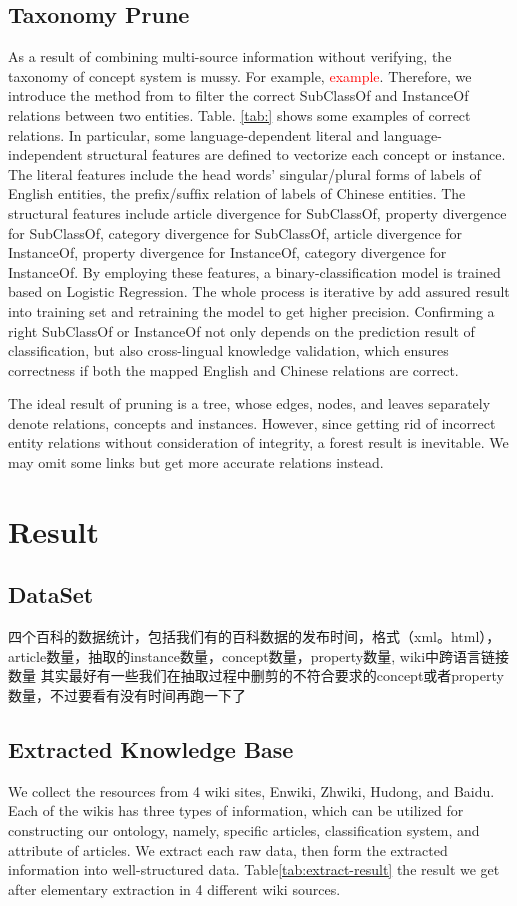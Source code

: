 \documentclass[runningheads,a4paper]{llncs}
\begin{document}
\subsection{Taxonomy Prune}
\label{sec:tp}
As a result of combining multi-source information without verifying, the taxonomy of concept system is mussy. For example, \textcolor{red}{example}. Therefore, we introduce the method from\cite{wang2014cross} to filter the correct SubClassOf and InstanceOf relations between two entities. Table. \ref{tab:} shows some examples of correct relations. In particular, some language-dependent literal and language-independent structural features are defined to vectorize each concept or instance. The literal features include the head words’ singular/plural forms of labels of English entities, the preﬁx/sufﬁx relation of labels of Chinese entities. The structural features include article divergence for SubClassOf, property divergence for SubClassOf, category divergence for SubClassOf, article divergence for InstanceOf, property divergence for InstanceOf, category divergence for InstanceOf. By employing these features, a binary-classification model is trained based on Logistic Regression. The whole process is iterative by add assured result into training set and retraining the model to get higher precision. Confirming a right SubClassOf or InstanceOf not only depends on the prediction result of classification, but also cross-lingual knowledge validation, which ensures correctness if both the mapped English and Chinese relations are correct. 

The ideal result of pruning is a tree, whose edges, nodes, and leaves separately denote relations, concepts and instances. However, since getting rid of incorrect entity relations without consideration of integrity, a forest result is inevitable. We may omit some links but get more accurate relations instead.

\section{Result}
\label{sec:result}
\subsection{DataSet}
四个百科的数据统计，包括我们有的百科数据的发布时间，格式（xml。html），article数量，抽取的instance数量，concept数量，property数量, wiki中跨语言链接数量
其实最好有一些我们在抽取过程中删剪的不符合要求的concept或者property数量，不过要看有没有时间再跑一下了
\subsection{Extracted Knowledge Base}
We collect the resources from 4 wiki sites, Enwiki, Zhwiki, Hudong, and Baidu. Each of the wikis has three types of information, which can be utilized for constructing our ontology, namely, specific articles, classification system, and attribute of articles. We extract each raw data, then form the extracted information into well-structured data. Table\ref{tab:extract-result} the result we get after elementary extraction in 4 different wiki sources.
\end{document}
